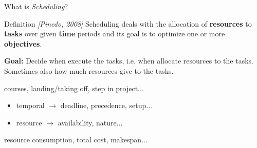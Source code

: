 \begin{frame}{What is {\it Scheduling}?}
  \vspace{0.3cm}
  \begin{block}{Definition {\small \it \color{blue!50!black!50}[Pinedo, 2008]}}
    Scheduling deals with the allocation of {\bf resources} to {\bf tasks} over
    given \textbf{time} periods and its goal is to optimize one or more \textbf{objectives}.
  \end{block}
\pause
  \vspace{0.3cm}
  {\bf Goal:} Decide when execute the tasks, i.e. when allocate resources
  to the tasks.
\pause
  \vspace{0.3cm}
  Sometimes also how much resources give to the tasks.
  \vspace{0.5cm}
 {\small  \begin{description}[constraints :]
    \pause
  \item[tasks :]  courses, landing/taking off, step in project... 
    \pause
  \item[constraints :]
    \begin{itemize}
    \item temporal $\rightarrow$ deadline, precedence, setup...
      \pause 
    \item resource $\rightarrow$ availability, nature... 
    \end{itemize}
    \pause
  \item[objective :] resource consumption, total cost, makespan...
  \end{description}}
  \vfill
\end{frame}


